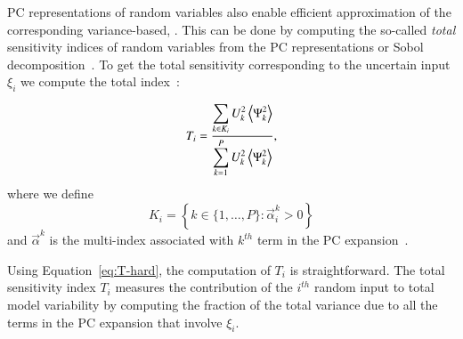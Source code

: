 PC representations of random variables also enable efficient
approximation of the corresponding variance-based, . This can be done by computing the so-called {\it total} 
sensitivity indices of random variables from the PC representations or Sobol decomposition~\citep{Sobol:1993,Homma:1996,Sobol:2001}. To get the total sensitivity corresponding to the uncertain
input $\xi_i$ we compute the total index~\citep{LeMaitreKnio2010,Crestaux,Sudret}:

\begin{equation} \label{eq:T-hard}
   T_i =
         \frac{\displaystyle
               \sum_{k \in K_i} U_k^2 \left\langle {\Psi_k^2} \right\rangle}
              {\displaystyle\sum_{k = 1}^P U_k^2 \left\langle {\Psi_k^2} \right\rangle},
\end{equation}
where we define \[
   K_i = \left\{ k \in \{1, \ldots, P\} :
           \vec{\alpha}^k_i > 0 \right\}
        \]
        and $\vec{\alpha}^k$ is the
multi-index associated with $k^{th}$ term in the
PC expansion~\cite{LeMaitreKnio2010}.

Using Equation~\eqref{eq:T-hard}, the computation of $T_i$ is straightforward.
The total sensitivity index $T_i$ measures the contribution of
the $i^{th}$ random input to total model variability by
computing the fraction of the total variance due to all the terms in the
PC expansion that involve $\xi_i$.


